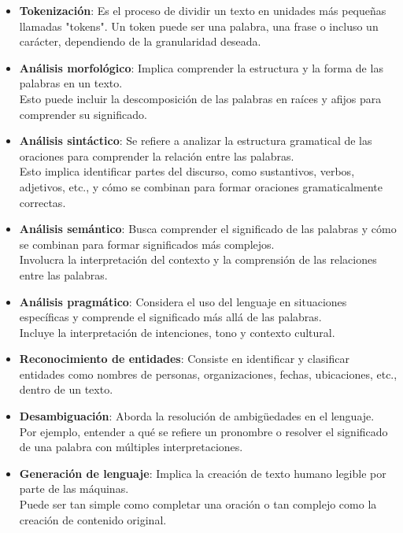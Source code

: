 \begin{itemize}
	\item \textbf{Tokenización}: Es el proceso de dividir un texto en unidades más 
	pequeñas llamadas "tokens". Un token puede ser una palabra, 
	una frase o incluso un carácter, dependiendo de la granularidad deseada.
	
	\item \textbf{Análisis morfológico}: Implica comprender la estructura y la forma 
	de las palabras en un texto.\\ Esto puede incluir la descomposición 
	de las palabras en raíces y afijos para comprender su significado.

	\item \textbf{Análisis sintáctico}: Se refiere a analizar la estructura 
	gramatical de las oraciones para comprender la relación entre las palabras.\\ 
	Esto implica identificar partes del discurso, como sustantivos, verbos, 
	adjetivos, etc., y cómo se combinan para formar oraciones 
	gramaticalmente correctas.
	
	\item \textbf{Análisis semántico}: Busca comprender el significado de las palabras y 
	cómo se combinan para formar significados más complejos. \\
	Involucra la interpretación del contexto y la comprensión 
	de las relaciones entre las palabras.
	
	\item \textbf{Análisis pragmático}: Considera el uso del lenguaje en situaciones 
	específicas y comprende el significado más allá de las palabras. \\
	Incluye la interpretación de intenciones, tono y contexto cultural.
	
	\item \textbf{Reconocimiento de entidades}: Consiste en identificar y clasificar 
	entidades como nombres de personas, organizaciones, fechas, ubicaciones, etc., 
	dentro de un texto.
	
	\item \textbf{Desambiguación}: Aborda la resolución de ambigüedades en el lenguaje.\\
	Por ejemplo, entender a qué se refiere un pronombre o resolver el significado 
	de una palabra con múltiples interpretaciones.
	
	\item \textbf{Generación de lenguaje}: Implica la creación de texto humano legible por parte 
	de las máquinas.\\ 
	Puede ser tan simple como completar una oración o tan complejo 
	como la creación de contenido original.
		 
\end{itemize}


